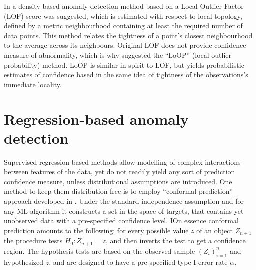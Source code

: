 \documentclass{extarticle}
\begin{document}
In \cite{breunig2000} a density-based anomaly detection method based on a Local Outlier
Factor (LOF) score was suggested, which is estimated with respect to local topology,
defined by a metric neighbourhood containing at least the required number of data
points. This method relates the tightness of a point's closest neighbourhood to the
average across its neighbours. Original LOF does not provide confidence measure of
abnormality, which is why \cite{kriegel2009} suggested the ``LoOP'' (local outlier
probability) method. LoOP is similar in spirit to LOF, but yields probabilistic
estimates of confidence based in the same idea of tightness of the observations's
immediate locality.


\section{Regression-based anomaly detection} %
\label{sec:regression_based_anomaly_detection}


Supervised regression-based methods allow modelling of complex interactions between
features of the data, yet do not readily yield any sort of prediction confidence
measure, unless distributional assumptions are introduced. One method to keep them
distribution-free is to employ ``conformal prediction'' approach developed in \cite{vovk2005}.
Under the standard independence assumption and for any ML algorithm it constructs
a set in the space of targets, that contains yet unobserved data with a pre-specified
confidence level. IOn essence conformal prediction amounts to the following: for
every possible value $z$ of an object $Z_{n+1}$ the procedure tests $H_0: Z_{n+1}=z$,
and then inverts the test to get a confidence region. The hypothesis tests are based
on the observed sample $(Z_i)_{i=1}^n$ and hypothesized $z$, and are designed to
have a pre-specified type-I error rate $\alpha$.
\end{document}
